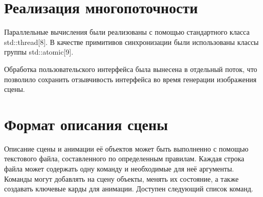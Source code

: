 \clearpage

\section{Реализация многопоточности}

Параллельные вычисления были реализованы с помощью стандартного класса std::thread[8]. В качестве примитивов синхронизации были использованы классы группы std::atomic[9].

Обработка пользовательского интерфейса была вынесена в отдельный поток, что позволило сохранить отзывчивость интерфейса во время генерации изображения сцены.

\section{Формат описания сцены}

Описание сцены и анимации её объектов может быть выполненно с помощью текстового файла, составленного по определенным правилам. Каждая строка файла может содержать одну команду и необходимые для неё аргументы.
Команды могут добавлять на сцену объекты, менять их состояние, а также создавать ключевые карды для анимации. Доступен следующий список команд.

